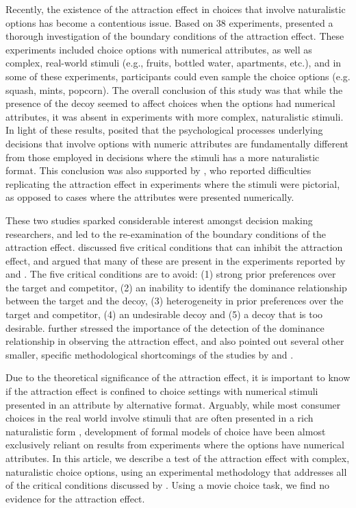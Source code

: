 \documentclass[12pt, a4paper]{article}
\begin{document}
Recently, the existence of the attraction effect in choices that involve naturalistic options has become a contentious issue. Based on 38 experiments,  presented a thorough investigation of the boundary conditions of the attraction effect. These experiments included choice options with numerical attributes, as well as complex, real-world stimuli (e.g., fruits, bottled water, apartments, etc.), and in some of these experiments, participants could even sample the choice options (e.g. squash, mints, popcorn). The overall conclusion of this study was that while the presence of the decoy seemed to affect choices when the options had numerical attributes, it was absent in experiments with more complex, naturalistic stimuli. In light of these results, \citeauthor{Frederick2014} posited that the psychological processes underlying decisions that involve options with numeric attributes are fundamentally different from those employed in decisions where the stimuli has a more naturalistic format. This conclusion was also supported by , who reported difficulties replicating the attraction effect in experiments where the stimuli were pictorial, as opposed to cases where the attributes were presented numerically.

These two studies sparked considerable interest amongst decision making researchers, and led to the re-examination of the boundary conditions of the attraction effect.  discussed five critical conditions that can inhibit the attraction effect, and argued that many of these are present in the experiments reported by \citeauthor{Frederick2014} and \citeauthor{Yang2014}. The five critical conditions are to avoid: (1) strong prior preferences over the target and competitor, (2) an inability to identify the dominance relationship  between the target and the decoy, (3) heterogeneity in prior preferences over the target and competitor, (4) an undesirable decoy and (5) a decoy that is too desirable.  further stressed the importance of the detection of the dominance relationship in observing the attraction effect, and also pointed out several other smaller, specific methodological shortcomings of the studies by \citeauthor{Frederick2014} and \citeauthor{Yang2014}.

Due to the theoretical significance of the attraction effect, it is important to know if the attraction effect is confined to choice settings with numerical stimuli presented in an attribute by alternative format. Arguably, while most consumer choices in the real world involve stimuli that are often presented in a rich naturalistic form \cite{Bhatia2018b}, development of formal models of choice have been almost exclusively reliant on results from experiments where the options have numerical attributes. In this article, we describe a test of the attraction effect with complex, naturalistic choice options, using an experimental methodology that addresses all of the critical conditions discussed by . Using a movie choice task, we find no evidence for the attraction effect.
\end{document}
